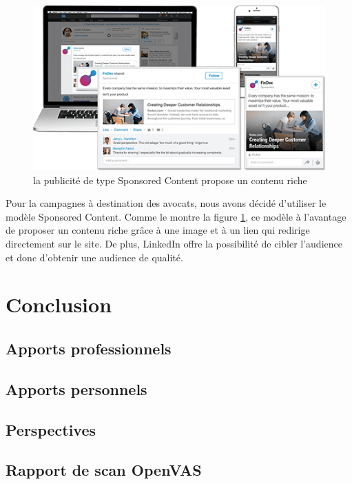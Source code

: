 \documentclass[]{report}
\begin{document}
      \begin{figure}[h!]
        \includegraphics[width=\linewidth]{img/linkedin_sponsored_content.png}
        \caption{la publicité de type Sponsored Content propose un contenu riche}
        \label{linkedin_sponsored_content}
      \end{figure}

      Pour la campagnes à destination des avocats, nous avons décidé d’utiliser le modèle Sponsored Content. Comme le montre la figure \ref{linkedin_sponsored_content}, ce modèle à l'avantage de proposer un contenu riche grâce à une image et à un lien qui redirige directement sur le site. De plus, LinkedIn offre la possibilité de cibler l'audience et donc d'obtenir une audience de qualité.


\chapter{Conclusion}

  \section{Apports professionnels}


  \section{Apports personnels}


  \section{Perspectives}



    \begin{appendix}
        \chapter{Rapport de scan OpenVAS}
        \label{openvas_report}
        
    \end{appendix}
\end{document}
